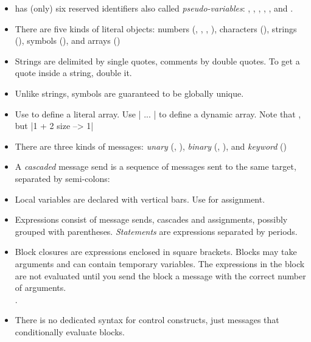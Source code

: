 \documentclass[a4paper,10pt,twoside]{book}
\begin{document}
\begin{itemize}

\item	\sq has (only) six reserved identifiers also called \textit{pseudo-variables}:
		, , , , , and .

\item	There are five kinds of literal objects:
		numbers (, , , ), characters (), strings (), symbols (), and arrays ()

\item	Strings are delimited by single quotes, comments by double quotes.
		To get a quote inside a string, double it.

\item	Unlike strings, symbols are guaranteed to be globally unique.

\item	Use  to define a literal array.
		Use \ct|{ ... }| to define a dynamic array.
		Note that
		, but
		\ct|{1 + 2} size --> 1|

\item	There are three kinds of messages:
		\emph{unary} (\eg {}, ),
		\emph{binary} (\eg {}, ), and
		\emph{keyword} (\eg {})

\item	A \emph{cascaded} message send is a sequence of messages sent to the same target, separated by semi-colons:

\item	Local variables are declared with vertical bars.
		Use \ct{:=} for assignment.

\item	Expressions consist of message sends, cascades and assignments, possibly grouped with parentheses.
		\emph{Statements} are expressions separated by periods.

\item	Block closures are expressions enclosed in square brackets.
		Blocks may take arguments and can contain temporary variables.
		The expressions in the block are not evaluated until you send the block a
		 message with the correct number of arguments.\\
		.

\item	There is no dedicated syntax for control constructs, just messages that conditionally evaluate blocks.\\

\end{itemize}

\ifx\wholebook\relax\else
\end{document}
